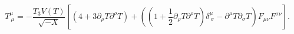\begin{equation}\label{trt}
T^\mu_{~\mu} = -\frac {T_3 V(T)}{\sqrt{-X }} \left[ (4 + 3
\partial_\rho T \partial^\rho T) +\left((1+\frac12 \partial_\rho T
\partial^\rho T)\delta^\mu_{~\sigma} - \partial^\mu T \partial_\sigma T
\right) F_{\mu\nu} F^{\sigma\nu} \right].
\end{equation}

